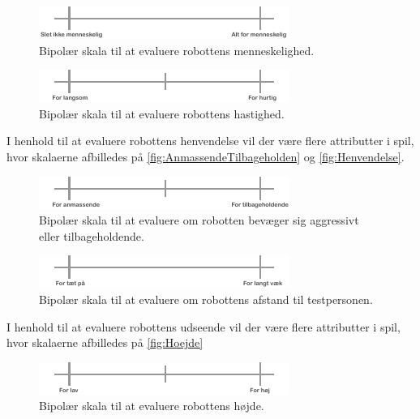 \noindent
%
%
\begin{figure}[H]
\centering
\includegraphics[width =\textwidth]{Figure/Menneskelig} 
\caption{Bipolær skala til at evaluere robottens menneskelighed.}
\label{fig:Menneskelig}
\end{figure}
\noindent
%
%
\begin{figure}[H]
\centering
\includegraphics[width =\textwidth]{Figure/Hastighed} 
\caption{Bipolær skala til at evaluere robottens hastighed.}
\label{fig:Hastighed}
\end{figure}
\noindent
%
I henhold til at evaluere robottens henvendelse vil der være flere attributter i spil, hvor skalaerne afbilledes på \autoref{fig:AnmassendeTilbageholden} og \autoref{fig:Henvendelse}.  
%
\begin{figure}[H]
\centering
\includegraphics[width =\textwidth]{Figure/AnmasendeTilbageholden} 
\caption{Bipolær skala til at evaluere om robotten bevæger sig aggressivt eller tilbageholdende.}
\label{fig:AnmassendeTilbageholden}
\end{figure}
\noindent
%
%
\begin{figure}[H]
\centering
\includegraphics[width =\textwidth]{Figure/Henvendelse} 
\caption{Bipolær skala til at evaluere om robottens afstand til testpersonen.}
\label{fig:Henvendelse}
\end{figure}
\noindent
%
I henhold til at evaluere robottens udseende vil der være flere attributter i spil, hvor skalaerne afbilledes på \autoref{fig:Hoejde}
%
\begin{figure}[H]
\centering
\includegraphics[width =\textwidth]{Figure/Hoejde} 
\caption{Bipolær skala til at evaluere robottens højde.}
\label{fig:Hoejde}
\end{figure}
\noindent
%



